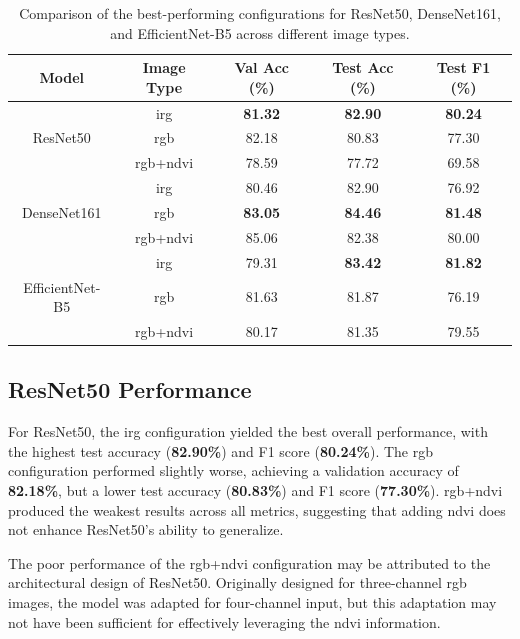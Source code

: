 \begin{table}[h]
    \centering
    \renewcommand{\arraystretch}{1.3}
    \setlength{\tabcolsep}{8pt}
    \begin{tabular}{|c|c|c|c|c|}
        \hline
        \textbf{Model} & \textbf{Image Type} & \textbf{Val Acc (\%)} & \textbf{Test Acc (\%)} & \textbf{Test F1 (\%)} \\
        \hline
                 & \gls{irg}        & \textbf{81.32}  & \textbf{82.90}  & \textbf{80.24} \\
        ResNet50 & \gls{rgb}        & 82.18  & 80.83  & 77.30 \\
                 & \gls{rgb}+\gls{ndvi}   & 78.59  & 77.72  & 69.58 \\
        \hline
                    & \gls{irg}        & 80.46  & 82.90  & 76.92 \\
        DenseNet161 & \gls{rgb}        & \textbf{83.05}  & \textbf{84.46}  & \textbf{81.48} \\
                    & \gls{rgb}+\gls{ndvi}   & 85.06  & 82.38  & 80.00 \\
        \hline
                        & \gls{irg}        & 79.31  & \textbf{83.42}  & \textbf{81.82} \\
        EfficientNet-B5 & \gls{rgb}        & 81.63  & 81.87  & 76.19 \\
                        & \gls{rgb}+\gls{ndvi}   & 80.17  & 81.35  & 79.55 \\
        \hline
    \end{tabular}
    \caption{Comparison of the best-performing configurations for ResNet50, DenseNet161, and EfficientNet-B5 across different image types.}
    \label{tab:model_comparison}
\end{table}


\subsection{ResNet50 Performance}
For ResNet50, the \gls{irg} configuration yielded the best overall performance, with the highest 
test accuracy (\textbf{82.90\%}) and F1 score (\textbf{80.24\%}). The \gls{rgb} configuration performed 
slightly worse, achieving a validation accuracy of \textbf{82.18\%}, but a lower test accuracy 
(\textbf{80.83\%}) and F1 score (\textbf{77.30\%}). \gls{rgb}+\gls{ndvi} produced the weakest results across all 
metrics, suggesting that adding \gls{ndvi} does not enhance ResNet50's ability to generalize.

The poor performance of the \gls{rgb}+\gls{ndvi} configuration may be attributed 
to the architectural design of ResNet50. Originally designed for three-channel 
\gls{rgb} images, the model was adapted for four-channel input, but this adaptation 
may not have been sufficient for effectively leveraging the \gls{ndvi} information. 


